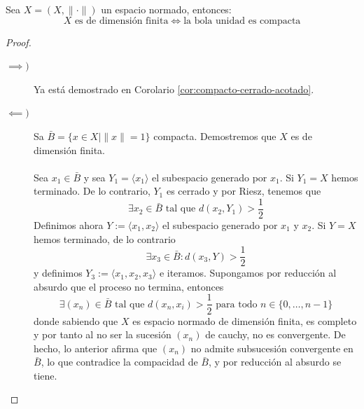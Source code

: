 \begin{teo}\label{teo:compacto-dim-finita}
    Sea $X = (X, \|\cdot\|)$ un espacio normado, entonces:
    \begin{equation*}
        X \text{ es de dimensión finita} \iff \text{la bola unidad es compacta}
    \end{equation*}

\begin{proof}
    \begin{description}
        \item[$\implies)$] Ya está demostrado en Corolario \ref{cor:compacto-cerrado-acotado}.
        \item[$\impliedby)$] Sa $\bar{B} = \{x \in X \mid \|x\| = 1\}$ compacta. Demostremos que $X$ es de dimensión finita. \\ \\
        \noindent
        Sea $x_1 \in \bar{B}$ y sea $Y_1 = \langle x_1 \rangle$ el subespacio generado por $x_1$. Si $Y_1 = X$ hemos terminado. De lo contrario, $Y_1$ es cerrado y por Riesz, tenemos que
        \begin{equation*}
            \exists x_2 \in \bar{B} \text{ tal que } d(x_2, Y_1) > \frac{1}{2}
        \end{equation*}
        Definimos ahora $Y:= \langle x_1, x_2 \rangle$ el subespacio generado por $x_1$ y $x_2$. Si $Y = X$ hemos terminado, de lo contrario 
        \begin{equation*}
            \exists x_3 \in \bar{B} : d(x_3, Y) > \frac{1}{2}
        \end{equation*}
        y definimos $Y_3 := \langle x_1, x_2, x_3 \rangle$ e iteramos. Supongamos por reducción al absurdo que el proceso no termina, entonces
        \begin{equation*}
            \exists (x_n) \in \bar{B} \text{ tal que } d(x_n, x_i) > \frac{1}{2} \text{ para todo } n \in \{0, \dots, n-1\}
        \end{equation*}
        donde sabiendo que $X$ es espacio normado de dimensión finita, es completo y por tanto al no ser la sucesión $(x_n)$ de cauchy, no es convergente. De hecho, lo anterior afirma que $(x_n)$ no admite subsucesión convergente en $\bar{B}$, lo que contradice la compacidad de $\bar{B}$, y por reducción al absurdo se tiene.
    \end{description}
\end{proof}
\end{teo}


